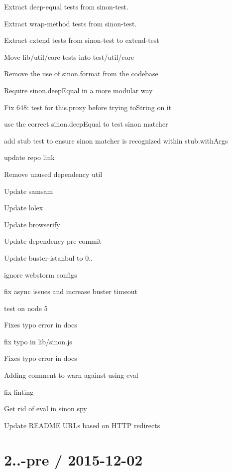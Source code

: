 \begin{DoxyItemize}
\item Extract {\ttfamily deep-\/equal} tests from {\ttfamily sinon-\/test}.
\item Extract {\ttfamily wrap-\/method} tests from {\ttfamily sinon-\/test}.
\item Extract {\ttfamily extend} tests from {\ttfamily sinon-\/test} to {\ttfamily extend-\/test}
\item Move \textquotesingle{}lib/util/core\textquotesingle{} tests into \textquotesingle{}test/util/core\textquotesingle{}
\item Remove the use of {\ttfamily sinon.\+format} from the codebase
\item Require sinon.\+deep\+Equal in a more modular way
\item Fix 648\+: test for this.\+proxy before trying to\+String on it
\item use the correct sinon.\+deep\+Equal to test sinon matcher
\item add stub test to ensure sinon matcher is recognized within stub.\+with\+Args
\item update repo link
\item Remove unused dependency util
\item Update samsam
\item Update lolex
\item Update browserify
\item Update dependency pre-\/commit
\item Update buster-\/istanbul to 0..
\item ignore webstorm configs
\item fix async issues and increase buster timeout
\item test on node 5
\item Fixes typo error in docs
\item fix typo in lib/sinon.\+js
\item Fixes typo error in docs
\item Adding comment to warn against using eval
\item fix linting
\item Get rid of eval in sinon spy
\item Update R\+E\+A\+D\+ME U\+R\+Ls based on H\+T\+TP redirects
\end{DoxyItemize}

\section*{2..-\/pre / 2015-\/12-\/02 }


